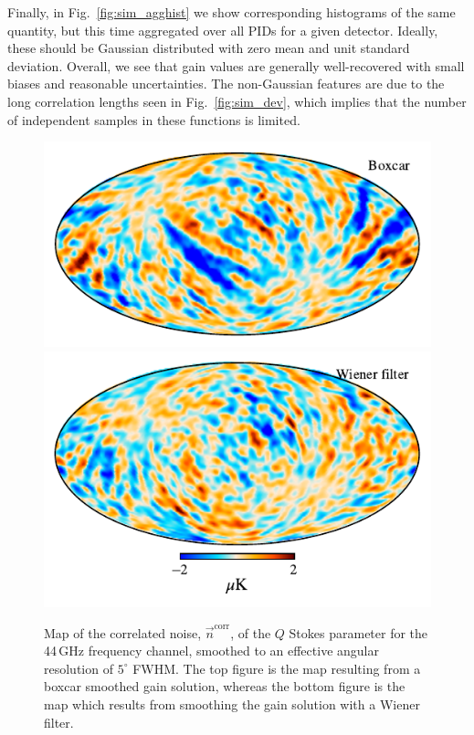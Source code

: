 \documentclass[twocolumn]{aa}
\newcommand{\n}[0]{\vec{n}}
\begin{document}
Finally, in Fig.~\ref{fig:sim_agghist} we show corresponding
histograms of the same quantity, but this time aggregated over all
PIDs for a given detector. Ideally, these should be Gaussian
distributed with zero mean and unit standard deviation. Overall, we
see that gain values are generally well-recovered with small biases
and reasonable uncertainties. The non-Gaussian features are due to the
long correlation lengths seen in Fig.~\ref{fig:sim_dev}, which implies
that the number of independent samples in these functions is limited.
\begin{figure}[t]
    \center
    \includegraphics[width=\linewidth]{figs/ncorr_Q_5deg_boxcar.pdf}\\\vspace*{-3mm}
    \includegraphics[width=\linewidth]{figs/ncorr_Q_5deg_wiener.pdf}
    \caption{Map of the correlated noise, $\n^{\mathrm{corr}}$, of the $Q$ Stokes parameter for the 44\,GHz
    frequency channel, smoothed to an effective angular resolution of
    $5^{\circ}$ FWHM. The top figure is the map resulting from a
    boxcar smoothed gain solution, whereas the bottom figure is the map which
    results from smoothing the gain solution with a Wiener filter.
    }\label{fig:corrstripes}
\end{figure}
\end{document}

